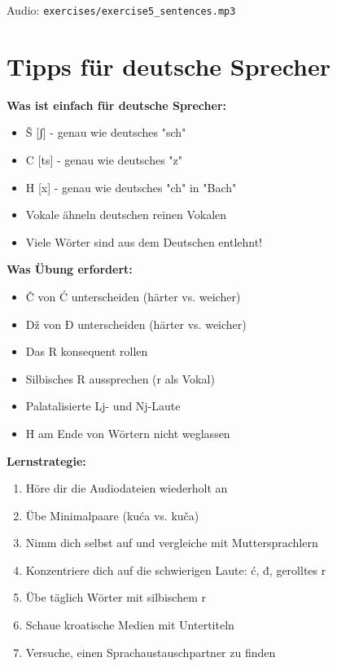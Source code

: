 Audio: \small\texttt{exercises/exercise5\_sentences.mp3}

\section{Tipps für deutsche Sprecher}

\begin{tcolorbox}[breakable, colback=lightblue!20, colframe=croatianblue, title=\textbf{Spezielle Tipps}]

\textbf{Was ist einfach für deutsche Sprecher:}
\begin{itemize}
    \item Š [ʃ] - genau wie deutsches "sch"
    \item C [ts] - genau wie deutsches "z"
    \item H [x] - genau wie deutsches "ch" in "Bach"
    \item Vokale ähneln deutschen reinen Vokalen
    \item Viele Wörter sind aus dem Deutschen entlehnt!
\end{itemize}

\textbf{Was Übung erfordert:}
\begin{itemize}
    \item Č von Ć unterscheiden (härter vs. weicher)
    \item Dž von Đ unterscheiden (härter vs. weicher)
    \item Das R konsequent rollen
    \item Silbisches R aussprechen (r als Vokal)
    \item Palatalisierte Lj- und Nj-Laute
    \item H am Ende von Wörtern nicht weglassen
\end{itemize}

\textbf{Lernstrategie:}
\begin{enumerate}
    \item Höre dir die Audiodateien wiederholt an
    \item Übe Minimalpaare (kuća vs. kuča)
    \item Nimm dich selbst auf und vergleiche mit Muttersprachlern
    \item Konzentriere dich auf die schwierigen Laute: ć, đ, gerolltes r
    \item Übe täglich Wörter mit silbischem r
    \item Schaue kroatische Medien mit Untertiteln
    \item Versuche, einen Sprachaustauschpartner zu finden
\end{enumerate}

\end{tcolorbox}

